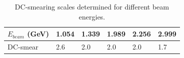 \begin{table}[H]%
\centering
    \caption{DC-smearing scales determined for different beam energies.}
    \label{tab:dcSmears}
    \begin{tabular}{ | l | l | l | l | l | l |}
    \hline
    $E_{beam}$ (GeV) & 1.054  & 1.339 & 1.989 & 2.256 & 2.999 \\ \hline
    DC-smear         & 2.6    & 2.0   & 2.0   & 2.0   & 1.7 \\  \hline
    \end{tabular}
\end{table}




